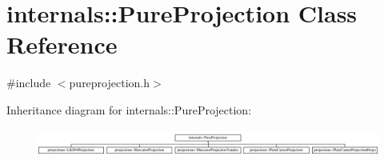 \hypertarget{classinternals_1_1_pure_projection}{\section{internals\-:\-:Pure\-Projection Class Reference}
\label{classinternals_1_1_pure_projection}
}


{\ttfamily \#include $<$pureprojection.\-h$>$}

Inheritance diagram for internals\-:\-:Pure\-Projection\-:\begin{figure}[H]
\begin{center}
\leavevmode
\includegraphics[height=0.906883cm]{classinternals_1_1_pure_projection}
\end{center}
\end{figure}
